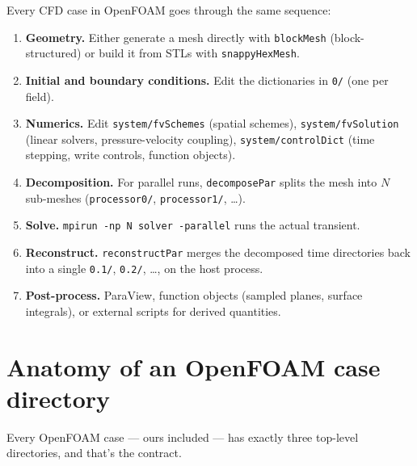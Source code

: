 \documentclass[11pt,a4paper]{article}
\begin{document}
Every CFD case in OpenFOAM goes through the same sequence:

\begin{enumerate}[leftmargin=1.5em]
    \item \textbf{Geometry.} Either generate a mesh directly with
    \texttt{blockMesh} (block-structured) or build it from STLs with
    \texttt{snappyHexMesh}.
    \item \textbf{Initial and boundary conditions.} Edit the
    dictionaries in \texttt{0/} (one per field).
    \item \textbf{Numerics.} Edit \texttt{system/fvSchemes} (spatial
    schemes), \texttt{system/fvSolution} (linear solvers,
    pressure-velocity coupling), \texttt{system/controlDict}
    (time stepping, write controls, function objects).
    \item \textbf{Decomposition.} For parallel runs,
    \texttt{decomposePar} splits the mesh into $N$ sub-meshes
    (\texttt{processor0/}, \texttt{processor1/}, \dots).
    \item \textbf{Solve.} \texttt{mpirun -np N solver -parallel} runs
    the actual transient.
    \item \textbf{Reconstruct.} \texttt{reconstructPar} merges the
    decomposed time directories back into a single \texttt{0.1/},
    \texttt{0.2/}, \dots, on the host process.
    \item \textbf{Post-process.} ParaView, function objects (sampled
    planes, surface integrals), or external scripts for derived
    quantities.
\end{enumerate}

\clearpage
\section{Anatomy of an OpenFOAM case directory}

Every OpenFOAM case --- ours included --- has exactly three top-level
directories, and that's the contract.
\end{document}
